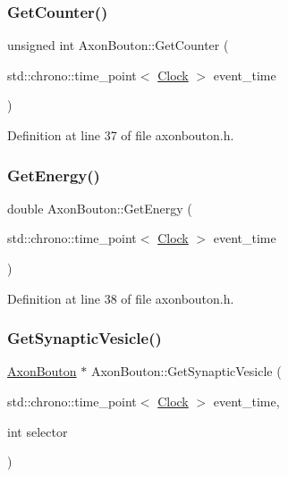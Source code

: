 \subsubsection{\texorpdfstring{Get\+Counter()}{GetCounter()}}
{\footnotesize\ttfamily unsigned int Axon\+Bouton\+::\+Get\+Counter (\begin{DoxyParamCaption}\item[{std\+::chrono\+::time\+\_\+point$<$ \hyperlink{universe_8h_a0ef8d951d1ca5ab3cfaf7ab4c7a6fd80}{Clock} $>$}]{event\+\_\+time }\end{DoxyParamCaption})\hspace{0.3cm}{\ttfamily [inline]}}



Definition at line 37 of file axonbouton.\+h.

\mbox{\label{class_axon_bouton_a8dff077a40565f4e3a34388a6c38a603}} 
\subsubsection{\texorpdfstring{Get\+Energy()}{GetEnergy()}}
{\footnotesize\ttfamily double Axon\+Bouton\+::\+Get\+Energy (\begin{DoxyParamCaption}\item[{std\+::chrono\+::time\+\_\+point$<$ \hyperlink{universe_8h_a0ef8d951d1ca5ab3cfaf7ab4c7a6fd80}{Clock} $>$}]{event\+\_\+time }\end{DoxyParamCaption})\hspace{0.3cm}{\ttfamily [inline]}}



Definition at line 38 of file axonbouton.\+h.

\mbox{\label{class_axon_bouton_a847ab3d3d214ddc85bdfd463c6d95d54}} 
\subsubsection{\texorpdfstring{Get\+Synaptic\+Vesicle()}{GetSynapticVesicle()}}
{\footnotesize\ttfamily \hyperlink{class_axon_bouton}{Axon\+Bouton} $\ast$ Axon\+Bouton\+::\+Get\+Synaptic\+Vesicle (\begin{DoxyParamCaption}\item[{std\+::chrono\+::time\+\_\+point$<$ \hyperlink{universe_8h_a0ef8d951d1ca5ab3cfaf7ab4c7a6fd80}{Clock} $>$}]{event\+\_\+time,  }\item[{int}]{selector }\end{DoxyParamCaption})}



